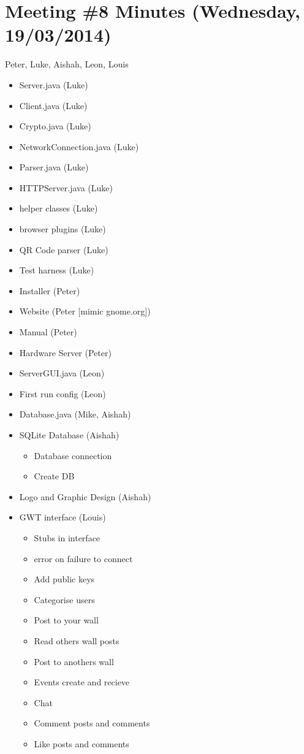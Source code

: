 \section{Meeting \#8 Minutes (Wednesday, 19/03/2014)}
Peter, Luke, Aishah, Leon, Louis
\begin{itemize}
\item Server.java		(Luke)
\item Client.java		(Luke)
\item Crypto.java		(Luke)
\item NetworkConnection.java	(Luke)
\item Parser.java		(Luke)
\item HTTPServer.java		(Luke)
\item helper classes		(Luke)
\item browser plugins		(Luke)
\item QR Code parser		(Luke)
\item Test harness		(Luke)
\item Installer		(Peter)
\item Website			(Peter [mimic gnome.org])
\item Manual			(Peter)
\item Hardware Server		(Peter)
\item ServerGUI.java		(Leon)
\item First run config	(Leon)
\item Database.java		(Mike, Aishah)
\item SQLite Database		(Aishah)
    \begin{itemize}
    \item Database connection
    \item Create DB
    \end{itemize}
\item Logo and Graphic Design	(Aishah)
\item GWT interface		(Louis)
    \begin{itemize}
    \item Stubs in interface
    \item error on failure to connect
    \item Add public keys
    \item Categorise users
    \item Post to your wall
    \item Read others wall posts
    \item Post to anothers wall
    \item Events create and recieve
    \item Chat
    \item Comment posts and comments
    \item Like posts and comments
    \end{itemize}
\end{itemize}

